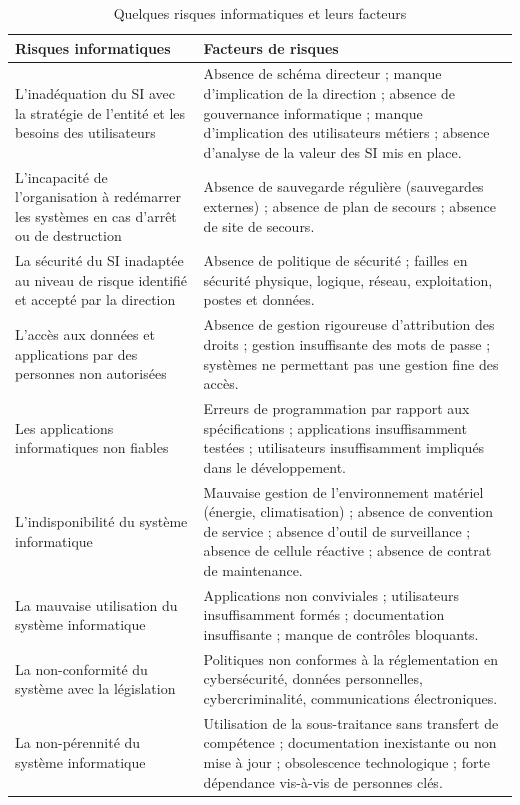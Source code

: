 \begin{table}[htbp]
\centering
\caption{Quelques risques informatiques et leurs facteurs}
\label{tab:risques_informatiques}
\small
\begin{tabular}{p{6cm}p{7.5cm}}
\toprule
\textbf{Risques informatiques} & \textbf{Facteurs de risques} \\
\midrule
L'inadéquation du SI avec la stratégie de l'entité et les besoins des utilisateurs &
  Absence de schéma directeur ; manque d'implication de la direction ; absence de
  gouvernance informatique ; manque d'implication des utilisateurs métiers ; absence
  d'analyse de la valeur des SI mis en place. \\
\midrule
L'incapacité de l'organisation à redémarrer les systèmes en cas d'arrêt ou de destruction &
  Absence de sauvegarde régulière (sauvegardes externes) ; absence de plan de
  secours ; absence de site de secours. \\
\midrule
La sécurité du SI inadaptée au niveau de risque identifié et accepté par la direction &
  Absence de politique de sécurité ; failles en sécurité physique, logique, réseau,
  exploitation, postes et données. \\
\midrule
L'accès aux données et applications par des personnes non autorisées &
  Absence de gestion rigoureuse d'attribution des droits ; gestion insuffisante des
  mots de passe ; systèmes ne permettant pas une gestion fine des accès. \\
\midrule
Les applications informatiques non fiables &
  Erreurs de programmation par rapport aux spécifications ; applications
  insuffisamment testées ; utilisateurs insuffisamment impliqués dans le
  développement. \\
\midrule
L'indisponibilité du système informatique &
  Mauvaise gestion de l'environnement matériel (énergie, climatisation) ; absence
  de convention de service ; absence d'outil de surveillance ; absence de cellule
  réactive ; absence de contrat de maintenance. \\
\midrule
La mauvaise utilisation du système informatique &
  Applications non conviviales ; utilisateurs insuffisamment formés ;
  documentation insuffisante ; manque de contrôles bloquants. \\
\midrule
La non-conformité du système avec la législation &
  Politiques non conformes à la réglementation en cybersécurité, données
  personnelles, cybercriminalité, communications électroniques. \\
\midrule
La non-pérennité du système informatique &
  Utilisation de la sous-traitance sans transfert de compétence ; documentation
  inexistante ou non mise à jour ; obsolescence technologique ; forte dépendance
  vis-à-vis de personnes clés. \\
\bottomrule
\end{tabular}
\end{table}

